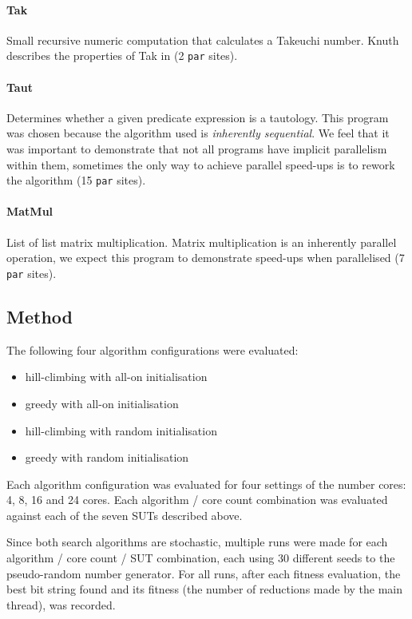 \paragraph{Tak}
Small recursive numeric computation that calculates a Takeuchi number. Knuth
describes the properties of Tak in \citep{ExamplesOfRecursion} (2 \verb-par- sites).

\paragraph{Taut}
Determines whether a given predicate expression is a tautology. This program
was chosen because the algorithm used is \emph{inherently sequential}. We feel
that it was important to demonstrate that not all programs have implicit parallelism
within them, sometimes the only way to achieve parallel speed-ups is to rework
the algorithm (15 \verb-par- sites).

\paragraph{MatMul}
List of list matrix multiplication. Matrix multiplication is an inherently parallel
operation, we expect this program to demonstrate speed-ups when parallelised (7 \verb-par- sites).

\subsection{Method}

The following four algorithm configurations were evaluated:
\begin{itemize}
	\item hill-climbing with all-on initialisation
	\item greedy with all-on initialisation
	\item hill-climbing with random initialisation
	\item greedy with random initialisation
\end{itemize}

Each algorithm configuration was evaluated for four settings of the number cores: 4, 8, 16 and 24 cores. Each algorithm / core count combination was evaluated against each of the seven SUTs described above.

Since both search algorithms are stochastic, multiple runs were made for each algorithm / core count / SUT combination, each using 30 different seeds to the pseudo-random number generator.  For all runs, after each fitness evaluation, the best bit string found and its fitness (the number of reductions made by the main thread), was recorded.

